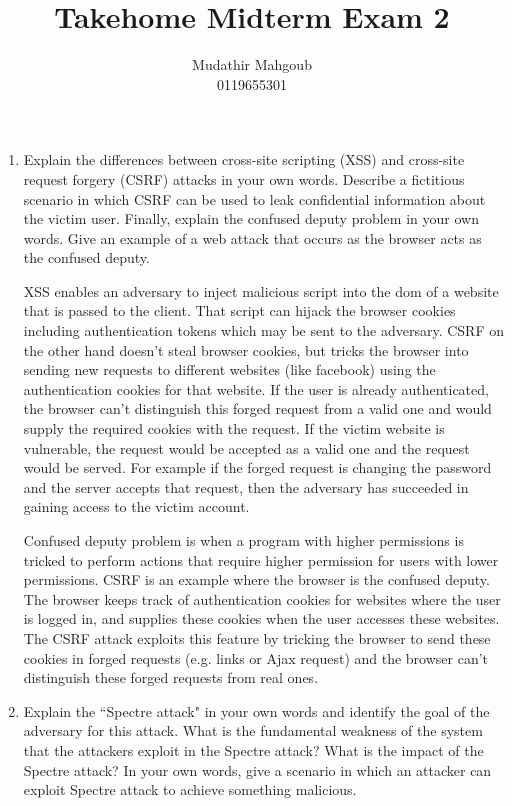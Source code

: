 \documentclass[12pt,a4paper]{article}
\author{Mudathir Mahgoub \\ 0119655301}
\title{Takehome Midterm Exam 2}
\begin{document}
\maketitle


\begin{enumerate}

\item Explain the differences between cross-site scripting (XSS) and cross-site
request forgery (CSRF) attacks in your own words. Describe a fictitious scenario in
which CSRF can be used to leak confidential information about the victim user. Finally,
explain the confused deputy problem in your own words. Give an example of a web
attack that occurs as the browser acts as the confused deputy.

\color{blue}
XSS enables an adversary to inject malicious script into the dom of a website that is passed to the client. 
That script can hijack the browser cookies including authentication tokens which may be sent to the adversary. CSRF on the other hand doesn't steal browser cookies, but tricks the browser into sending new  requests to different websites (like facebook) using the authentication cookies for that website. If the user is already authenticated, the browser can't distinguish this forged request from a valid one and would supply the required cookies with the request. If the victim website is vulnerable, the request would be accepted as a valid one and the request would be served. For example if the forged request is changing the password and the server accepts that request, then the adversary has succeeded in gaining access to the victim account. 

Confused deputy problem is when a program with higher permissions is tricked to perform actions that require higher permission for users with lower permissions. CSRF is an example where the browser is the confused deputy. The browser keeps track of authentication cookies for websites where the user is logged in, and supplies these cookies when the user accesses these websites. The CSRF attack exploits this feature by tricking the browser to send these cookies in forged requests (e.g. links or Ajax request) and the browser can't distinguish these forged requests from real ones. 
\color{black}

\item Explain the ``Spectre attack" in your own words and identify the goal of
the adversary for this attack. What is the fundamental weakness of the system that
the attackers exploit in the Spectre attack? What is the impact of the Spectre attack?
In your own words, give a scenario in which an attacker can exploit Spectre attack to
achieve something malicious.



\end{enumerate}
\end{document}
